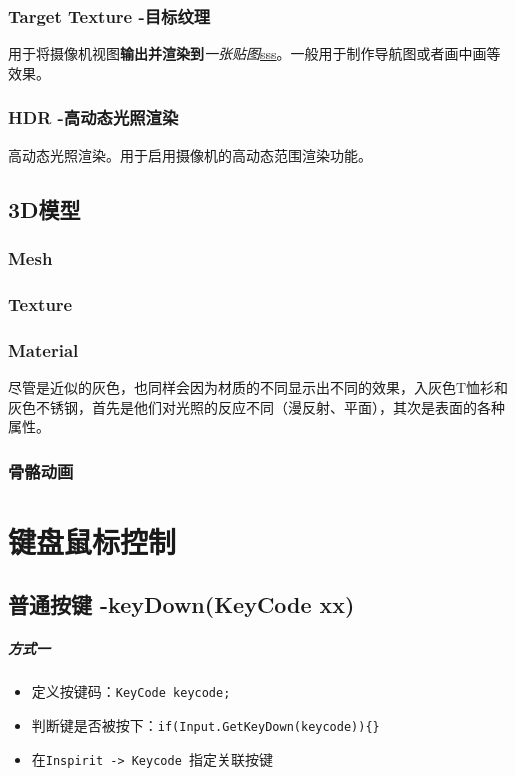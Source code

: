 \documentclass[UTF8,a4paper,12pt]{ctexbook}
\begin{document}
		\subsection{Target Texture -目标纹理}
			用于将摄像机视图\textbf{输出并渲染到}\textit{一张贴图}\underline{sss}。一般用于制作导航图或者画中画等效果。
			
		\subsection{HDR -高动态光照渲染}
			高动态光照渲染。用于启用摄像机的高动态范围渲染功能。
	
	\section{3D模型}
		\subsection{Mesh}
		
		\subsection{Texture}
				
		\subsection{Material}
			尽管是近似的灰色，也同样会因为材质的不同显示出不同的效果，入灰色T恤衫和灰色不锈钢，首先是他们对光照的反应不同（漫反射、平面），其次是表面的各种属性。
			
		\subsection{骨骼动画}
	
	
	
\chapter{键盘鼠标控制}
	\section{普通按键 -keyDown(KeyCode xx)}
		\paragraph{方式一}
		
			\begin{itemize}
				\item 定义按键码：\verb|KeyCode keycode;|
				\item 判断键是否被按下：\verb|if(Input.GetKeyDown(keycode)){}|
				\item 在\verb|Inspirit -> Keycode |指定关联按键
			\end{itemize}
	
\end{document}
